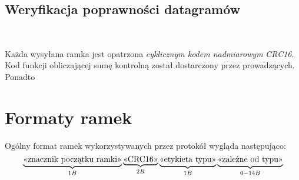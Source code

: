\documentclass[a4paper,12pt]{article}
\begin{document}
\subsection{Weryfikacja poprawności datagramów}\

Każda wysyłana ramka jest opatrzona \emph{cyklicznym kodem nadmiarowym}
\emph{CRC16}. Kod funkcji obliczającej sumę kontrolną został dostarczony
przez prowadzących. Ponadto 

\section{Formaty ramek}

Ogólny format ramek wykorzystywanych przez protokół wygląda następująco:
\begin{displaymath}
  \underbrace{\hbox{<<znacznik początku ramki>>}}_{1B}
  \underbrace{\hbox{<<CRC16>>}}_{2B}
  \underbrace{\hbox{<<etykieta typu>>}}_{1B}
  \underbrace{\hbox{<<zależne od typu>>}}_{0-14B}
\end{displaymath}
\end{document}
